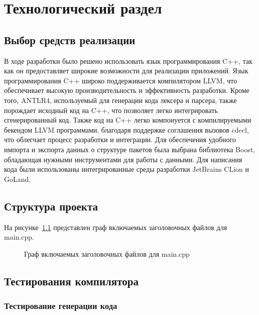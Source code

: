 \chapter{Технологический раздел}
\label{cha:impl}

\section{Выбор средств реализации}

В ходе разработки было решено использовать язык программирования C++, так как он предоставляет широкие возможности для реализации приложений.
Язык программирования C++ широко поддерживается компилятором LLVM, что обеспечивает высокую производительность и эффективность разработки.
Кроме того, ANTLR4, используемый для генерации кода лексера и парсера, также порождает исходный код на C++, что позволяет легко интегрировать сгенерированный код.
Также код на C++ легко компонуется с компилируемыми бекендом LLVM программами, благодаря поддержке соглашения вызовов cdecl, что облегчает процесс разработки и интеграции.
Для обеспечения удобного импорта и экспорта данных о структуре пакетов была выбрана библиотека Boost, обладающая нужными инструментами для работы с данными.
Для написания кода были использованы интегрированные среды разработки JetBrains CLion и GoLand.

\section*{Структура проекта}


На рисунке~\ref{fig:code-usage} представлен граф включаемых заголовочных файлов для main.cpp.

\begin{figure}[h]
    \centering

    

    \caption{Граф включаемых заголовочных файлов для main.cpp}
    \label{fig:code-usage}
\end{figure}


\section{Тестирования компилятора}

\subsection*{Тестирование генерации кода}

